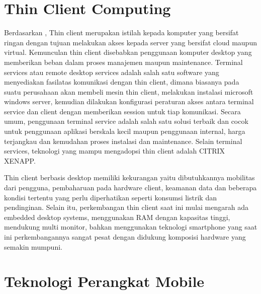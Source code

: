 \section{Thin Client Computing}
Berdasarkan \cite{thin_client_computing}, Thin client merupakan istilah kepada komputer yang bersifat ringan dengan tujuan melakukan akses kepada server yang bersifat cloud maupun virtual. Kemunculan thin client disebabkan penggunaan komputer desktop yang memberikan beban dalam proses manajemen maupun maintenance.  Terminal services atau remote desktop services adalah salah satu software yang menyediakan fasilatas komunikasi dengan thin client, dimana biasanya pada suatu perusahaan akan membeli mesin thin client, melakukan instalasi microsoft windows server, kemudian dilakukan konfigurasi peraturan akses antara terminal service dan client dengan memberikan session untuk tiap komunikasi. Secara umum, penggunaan terminal service adalah salah satu solusi terbaik dan cocok untuk penggunaan aplikasi berskala kecil maupun penggunaan internal, harga terjangkau dan kemudahan proses instalasi dan maintenance. Selain terminal services, teknologi yang mampu mengadopsi thin client adalah CITRIX XENAPP.

Thin client berbasis desktop memiliki kekurangan yaitu dibutuhkannya mobilitas dari pengguna, pembaharuan pada hardware client, keamanan data dan beberapa kondisi tertentu yang perlu diperhatikan seperti konsumsi listrik dan pendinginan. Selain itu, perkembangan thin client saat ini mulai mengarah ada embedded desktop systems, menggunakan RAM dengan kapasitas tinggi, mendukung multi monitor, bahkan menggunakan teknologi smartphone yang saat ini perkembangannya sangat pesat dengan didukung komposisi hardware yang semakin mumpuni.

\section{Teknologi Perangkat Mobile}
